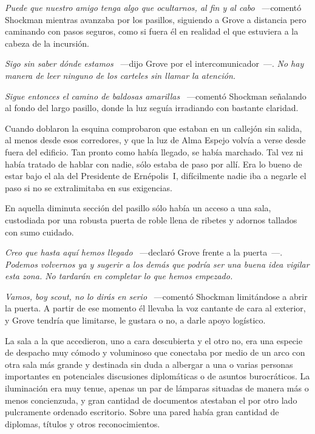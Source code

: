 \emph{Puede que nuestro amigo tenga algo que ocultarnos, al fin y al cabo} ~---comentó Shockman mientras avanzaba por los pasillos, siguiendo a Grove a distancia pero caminando con pasos seguros, como si fuera él en realidad el que estuviera a la cabeza de la incursión.

\emph{Sigo sin saber dónde estamos} ~---dijo Grove por el intercomunicador~---. \emph{No hay manera de leer ninguno de los carteles sin llamar la atención.}

\emph{Sigue entonces el camino de baldosas amarillas} ~---comentó Shockman señalando al fondo del largo pasillo, donde la luz seguía irradiando con bastante claridad.

Cuando doblaron la esquina comprobaron que estaban en un callejón sin salida, al menos desde esos corredores, y que la luz de Alma Espejo volvía a verse desde fuera del edificio. Tan pronto como había llegado, se había marchado. Tal vez ni había tratado de hablar con nadie, sólo estaba de paso por allí. Era lo bueno de estar bajo el ala del Presidente de Ernépolis~I, difícilmente nadie iba a negarle el paso si no se extralimitaba en sus exigencias.

En aquella diminuta sección del pasillo sólo había un acceso a una sala, custodiada por una robusta puerta de roble llena de ribetes y adornos tallados con sumo cuidado.

\emph{Creo que hasta aquí hemos llegado} ~---declaró Grove frente a la puerta~---. \emph{Podemos volvernos ya y sugerir a los demás que podría ser una buena idea vigilar esta zona. No tardarán en completar lo que hemos empezado.}

\emph{Vamos, boy scout, no lo dirás en serio} ~---comentó Shockman limitándose a abrir la puerta. A partir de ese momento él llevaba la voz cantante de cara al exterior, y Grove tendría que limitarse, le gustara o no, a darle apoyo logístico.

La sala a la que accedieron, uno a cara descubierta y el otro no, era una especie de despacho muy cómodo y voluminoso que conectaba por medio de un arco con otra sala más grande y destinada sin duda a albergar a una o varias personas importantes en potenciales discusiones diplomáticas o de asuntos burocráticos. La iluminación era muy tenue, apenas un par de lámparas situadas de manera más o menos concienzuda, y gran cantidad de documentos atestaban el por otro lado pulcramente ordenado escritorio. Sobre una pared había gran cantidad de diplomas, títulos y otros reconocimientos.

